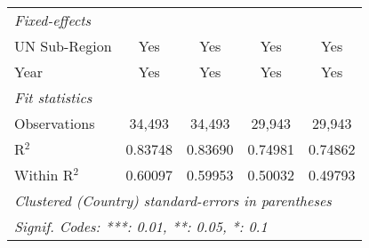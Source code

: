 \begin{tabular}{lcccc}
   \midrule
   \emph{Fixed-effects}\\
   UN Sub-Region                               & Yes            & Yes             & Yes            & Yes\\  
   Year                                        & Yes            & Yes             & Yes            & Yes\\  
   \midrule
   \emph{Fit statistics}\\
   Observations                                & 34,493         & 34,493          & 29,943         & 29,943\\  
   R$^2$                                       & 0.83748        & 0.83690         & 0.74981        & 0.74862\\  
   Within R$^2$                                & 0.60097        & 0.59953         & 0.50032        & 0.49793\\  
   \midrule \midrule
   \multicolumn{5}{l}{\emph{Clustered (Country) standard-errors in parentheses}}\\
   \multicolumn{5}{l}{\emph{Signif. Codes: ***: 0.01, **: 0.05, *: 0.1}}\\
\end{tabular}
\par\endgroup


